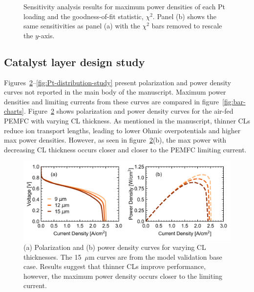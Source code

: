 \documentclass[final,3p,times,onecolumn]{elsarticle}    %
\newcommand{\crr}[1]{\color{red} #1 \color{black}} %
\begin{document}
{\begin{figure}[!htb]
    \crr{\caption{\crr{Sensitivity analysis results for maximum power densities of each Pt loading and the goodness-of-fit statistic, $\chi^2$. Panel (b) shows the same sensitivities as panel (a) with the $\chi^2$ bars removed to rescale the $y$-axis.}}}
    \label{fig:sensitivity}
\end{figure}
}

\newpage
\crr{\subsection{Catalyst layer design study}}
Figures~\ref{fig:CL-thickness-study}--\ref{fig:Pt-distribution-study} present polarization and power density curves not reported in the main body of the manuscript. \crr{Maximum power densities and limiting currents from these curves are compared in figure~\ref{fig:bar-charts}.} Figure~\ref{fig:CL-thickness-study} shows polarization and power density curves for the air-fed PEMFC with varying CL thickness. As mentioned in the manuscript, thinner CLs reduce ion transport lengths, leading to lower Ohmic overpotentials and higher max power densities.  However, as seen in figure~\ref{fig:CL-thickness-study}(b), the max power with decreasing CL thickness occurs closer and closer to the PEMFC limiting current. 
\begin{figure}[!htb]
    \centering
    \includegraphics[width=5.718in]{figures_uniform/CL-thickness-5_718in.png}
    \crr{
    \caption{(a) Polarization and (b) power density curves for varying CL thicknesses. The 15~$\mu$m curves are from the model validation base case. Results suggest that thinner CLs improve performance, however, the maximum power density occurs closer to the limiting current.}}
    \label{fig:CL-thickness-study}
\end{figure}
\end{document}
